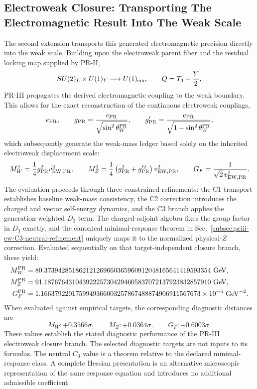 \documentclass[11pt]{article}
\begin{document}
\subsection{Electroweak Closure: Transporting The Electromagnetic Result Into The Weak Scale}
\label{subsec:priii-electroweak-obligation}

The second extension transports this generated electromagnetic precision directly into the weak scale. Building upon the electroweak parent fiber and the residual locking map supplied by PR-II,
\begin{equation}
SU(2)_L\times U(1)_Y\longrightarrow U(1)_{\rm em},
\qquad
Q=T_3+\frac{Y}{2},
\end{equation}
PR-III propagates the derived electromagnetic coupling to the weak boundary. This allows for the exact reconstruction of the continuous electroweak couplings,
\begin{equation}
e_{\rm PR},\qquad
 g_{\rm PR}=\frac{e_{\rm PR}}{\sqrt{\sin^2\theta_W^{\rm PR}}},\qquad
 g'_{\rm PR}=\frac{e_{\rm PR}}{\sqrt{1-\sin^2\theta_W^{\rm PR}}},
\end{equation}
which subsequently generate the weak-mass ledger based solely on the inherited electroweak displacement scale:
\begin{equation}
M_W^2=\frac14 g_{\rm PR}^2 v_{\rm EW,PR}^2,
\qquad
M_Z^2=\frac14\left(g_{\rm PR}^2+g_{\rm PR}^{\prime 2}\right)v_{\rm EW,PR}^2,
\qquad
G_F=\frac{1}{\sqrt2\,v_{\rm EW,PR}^2} .
\end{equation}
The evaluation proceeds through three constrained refinements: the C1 transport establishes baseline weak-mass consistency, the C2 correction introduces the charged and vector self-energy dynamics, and the C3 branch applies the generation-weighted $D_3$ term.  The charged-adjoint algebra fixes the group factor in $D_3$ exactly, and the canonical minimal-response theorem in Sec.~\ref{subsec:priii-ew-C3-neutral-refinement} uniquely maps it to the normalized physical-$Z$ correction.  Evaluated sequentially on that target-independent closure branch, these yield:
\begin{align}
M_W^{\rm PR} &=80.373942851862121269660365960912048165641419593354\ {\rm GeV},\\
M_Z^{\rm PR} &=91.187676431043922257304294605837072137923832857910\ {\rm GeV},\\
G_F^{\rm PR} &=1.1663792201759949366003257867488874906911567673\times10^{-5}\ {\rm GeV}^{-2}.
\end{align}
When evaluated against empirical targets, the corresponding diagnostic distances are
\begin{equation}
M_W:+0.3566\sigma,\qquad
M_Z:+0.0364\sigma,\qquad
G_F:+0.6003\sigma .
\end{equation}
These values establish the stated diagnostic performance of the PR-III
electroweak closure branch.  The selected diagnostic targets are not inputs to its formulas.  The neutral \(C_3\) value is a theorem relative to the declared minimal-response class.  A complete Hessian presentation is an alternative microscopic representation of the same response equation and introduces no additional admissible coefficient.
\end{document}
